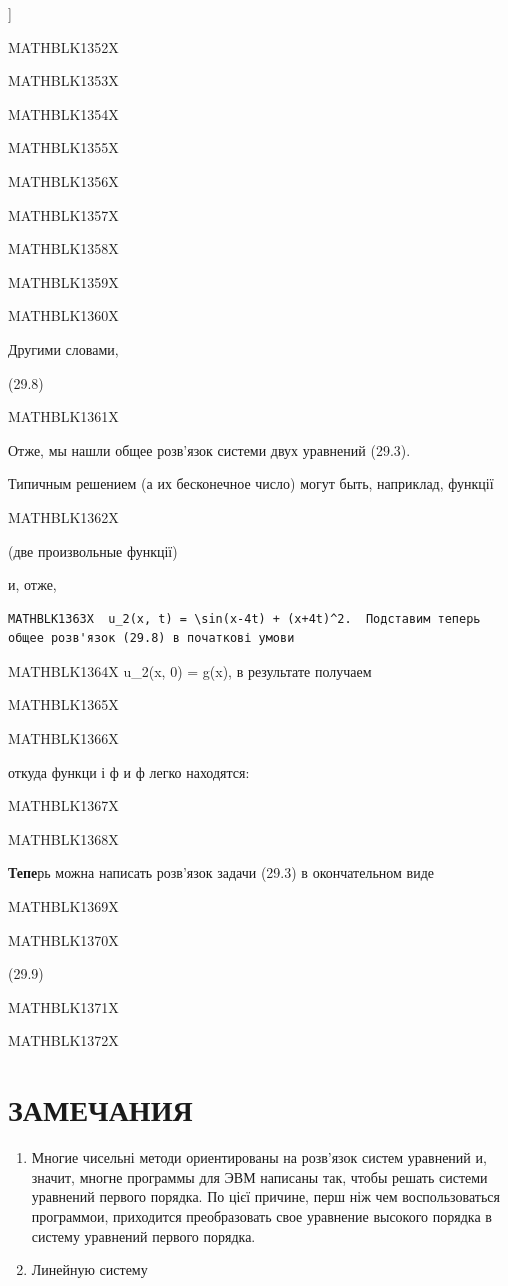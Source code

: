 \documentclass[
  ukrainian,
]{article}
\begin{document}
{]}

MATHBLK1352X

MATHBLK1353X

MATHBLK1354X

MATHBLK1355X

MATHBLK1356X

MATHBLK1357X

MATHBLK1358X

MATHBLK1359X

MATHBLK1360X

Другими словами,

(29.8)

MATHBLK1361X

Отже, мы нашли общее розв'язок системи двух уравнений (29.3).

Типичным решением (а их бесконечное число) могут быть, наприклад,
функції

MATHBLK1362X

(две произвольные функції)

и, отже,

\begin{verbatim}
MATHBLK1363X  u_2(x, t) = \sin(x-4t) + (x+4t)^2.  Подставим теперь общее розв'язок (29.8) в початкові умови
\end{verbatim}

MATHBLK1364X u\_2(x, 0) = g(x), в результате получаем

MATHBLK1365X

MATHBLK1366X

откуда функци і ф и ф легко находятся:

MATHBLK1367X

MATHBLK1368X

\textbf{Тепе}рь можна написать розв'язок задачи (29.3) в окончательном
виде

MATHBLK1369X

MATHBLK1370X

(29.9)

MATHBLK1371X

MATHBLK1372X

\section{ЗАМЕЧАНИЯ}\label{ux437ux430ux43cux435ux447ux430ux43dux438ux44f-10}

\begin{enumerate}
\def\labelenumi{\arabic{enumi}.}
\item
  Многие чисельні методи ориентированы на розв'язок систем уравнений и,
  значит, многне программы для ЭВМ написаны так, чтобы решать системи
  уравнений первого порядка. По цієї причине, перш ніж чем
  воспользоваться программои, приходится преобразовать свое уравнение
  высокого порядка в систему уравнений первого порядка.
\item
  Линейную систему
\end{enumerate}
\end{document}
